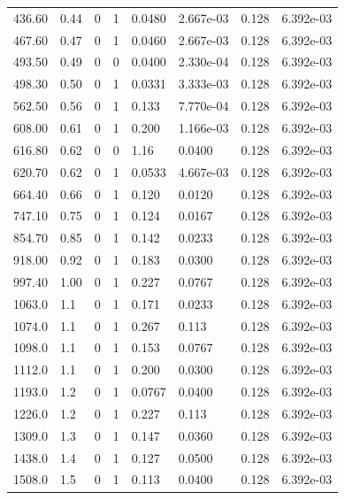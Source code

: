 \documentclass[preview]{standalone}
\begin{document}
{{\begin{tabular}{L{1.2cm}C{1.2cm} C{0.3cm}C{0.5cm} C{1.4cm}C{1.4cm} C{1.4cm}C{1.4cm}}
  436.60  &  0.44  & 0     &  1 &  0.0480  & 2.667e-03  & 0.128 &  6.392e-03   \\ 
  467.60  &  0.47  & 0     &  1 &  0.0460  & 2.667e-03  & 0.128 &  6.392e-03   \\ 
  493.50  &  0.49  & 0     &  0 &  0.0400  & 2.330e-04  & 0.128 &  6.392e-03   \\ 
  498.30  &  0.50  & 0     &  1 &  0.0331  & 3.333e-03  & 0.128 &  6.392e-03   \\ 
  562.50  &  0.56  & 0     &  1 &  0.133  & 7.770e-04  & 0.128 &  6.392e-03   \\ 
  608.00  &  0.61  & 0     &  1 &  0.200  & 1.166e-03  & 0.128 &  6.392e-03   \\ 
  616.80  &  0.62  & 0     &  0 &  1.16  & 0.0400  & 0.128 &  6.392e-03   \\ 
  620.70  &  0.62  & 0     &  1 &  0.0533  & 4.667e-03  & 0.128 &  6.392e-03   \\ 
  664.40  &  0.66  & 0     &  1 &  0.120  & 0.0120  & 0.128 &  6.392e-03   \\ 
  747.10  &  0.75  & 0     &  1 &  0.124  & 0.0167  & 0.128 &  6.392e-03   \\ 
  854.70  &  0.85  & 0     &  1 &  0.142  & 0.0233  & 0.128 &  6.392e-03   \\ 
  918.00  &  0.92  & 0     &  1 &  0.183  & 0.0300  & 0.128 &  6.392e-03   \\ 
  997.40  &  1.00  & 0     &  1 &  0.227  & 0.0767  & 0.128 &  6.392e-03   \\ 
  1063.0  &   1.1  & 0     &  1 &  0.171  & 0.0233  & 0.128 &  6.392e-03   \\ 
  1074.0  &   1.1  & 0     &  1 &  0.267  & 0.113  & 0.128 &  6.392e-03   \\ 
  1098.0  &   1.1  & 0     &  1 &  0.153  & 0.0767  & 0.128 &  6.392e-03   \\ 
  1112.0  &   1.1  & 0     &  1 &  0.200  & 0.0300  & 0.128 &  6.392e-03   \\ 
  1193.0  &   1.2  & 0     &  1 &  0.0767  & 0.0400  & 0.128 &  6.392e-03   \\ 
  1226.0  &   1.2  & 0     &  1 &  0.227  & 0.113  & 0.128 &  6.392e-03   \\ 
  1309.0  &   1.3  & 0     &  1 &  0.147  & 0.0360  & 0.128 &  6.392e-03   \\ 
  1438.0  &   1.4  & 0     &  1 &  0.127  & 0.0500  & 0.128 &  6.392e-03   \\ 
  1508.0  &   1.5  & 0     &  1 &  0.113  & 0.0400  & 0.128 &  6.392e-03   \\ 

\end{tabular}}}
\end{document}
